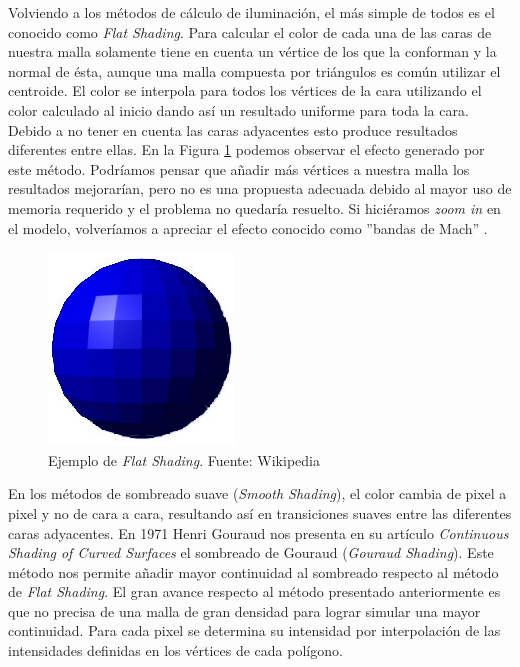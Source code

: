 \documentclass[titlepage,12pt]{report}
\begin{document}
Volviendo a los métodos de cálculo de iluminación, el más simple de todos es el conocido como \textit{Flat Shading}. Para calcular el color de cada una de las caras de nuestra malla solamente tiene en cuenta un vértice de los que la conforman y la normal de ésta, aunque una malla compuesta por triángulos es común utilizar el centroide. El color se interpola para todos los vértices de la cara utilizando el color calculado al inicio dando así un resultado uniforme para toda la cara. Debido a no tener en cuenta las caras adyacentes esto produce resultados diferentes entre ellas. En la Figura \ref{flat:shading} podemos observar el efecto generado por este método. Podríamos pensar que añadir más vértices a nuestra malla los resultados mejorarían, pero no es una propuesta adecuada debido al mayor uso de memoria requerido y el problema no quedaría resuelto. Si hiciéramos \textit{zoom in} en el modelo, volveríamos a apreciar el efecto conocido como ''bandas de Mach'' \citep{Lotto1999}.

\begin{figure}[ht]
	\centering
	\includegraphics[scale=0.5]{media/Flat-shading-sample.png}
	\caption{Ejemplo de \textit{Flat Shading}. Fuente: Wikipedia}
	\label{flat:shading}
\end{figure}

En los métodos de sombreado suave (\textit{Smooth Shading}), el color cambia de pixel a pixel y no de cara a cara, resultando así en transiciones suaves entre las diferentes caras adyacentes.
En 1971 Henri Gouraud nos presenta en su artículo \textit{Continuous Shading of Curved Surfaces} \citep{Henri1971} el sombreado de Gouraud (\textit{Gouraud Shading}). Este método nos permite añadir mayor continuidad al sombreado respecto al método de \textit{Flat Shading}. El gran avance respecto al método presentado anteriormente es que no precisa de una malla de gran densidad para lograr simular una mayor continuidad. Para cada pixel se determina su intensidad por interpolación de las intensidades definidas en los vértices de cada polígono.
\end{document}
